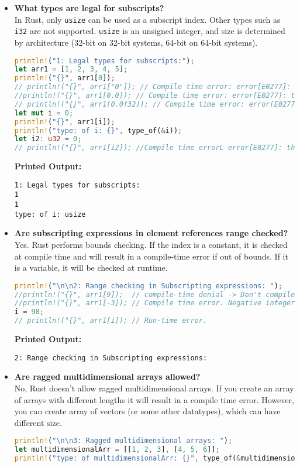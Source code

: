 \documentclass{article}
\begin{document}
\begin{itemize}
\item \textbf{What types are legal for subscripts?} \\
    In Rust, only \texttt{usize} can be used as a subscript index. Other types such as \texttt{i32} are not supported. \texttt{usize} is an unsigned integer, and size is determined by architecture (32-bit on 32-bit systems, 64-bit on 64-bit systems).  
\begin{lstlisting}[language=Rust]
println!("1: Legal types for subscripts:");
let arr1 = [1, 2, 3, 4, 5];
println!("{}", arr1[0]);
// println!("{}", arr1["0"]); // Compile time error: error[E0277]: the type `[{integer}]` cannot be indexed by `&str`
//println!("{}", arr1[0.0]); // Compile time error: error[E0277]: the type `[{integer}]` cannot be indexed by `float`
// println!("{}", arr1[0.0f32]); // Compile time error: error[E0277]: the type `[{integer}]` cannot be indexed by `f32`
let mut i = 0;
println!("{}", arr1[i]);
println!("type: of i: {}", type_of(&i));
let i2: u32 = 0;
// println!("{}", arr1[i2]); //Compile time errorL error[E0277]: the type `[{integer}]` cannot be indexed by `u32`
\end{lstlisting}
\textbf{Printed Output:}
\begin{verbatim}
1: Legal types for subscripts:
1
1
type: of i: usize
\end{verbatim}



\item \textbf{Are subscripting expressions in element references range checked?} \\
Yes. Rust performs bounds checking. If the index is a constant, it is checked at compile time and will result in a compile-time error if out of bounds. If it is a variable, it will be checked at runtime.
\begin{lstlisting}[language=Rust]
println!("\n\n2: Range checking in Subscripting expressions: ");
//println!("{}", arr1[9]);  // compile-time denial -> Don't compile.
//println!("{}", arr1[-3]); // Compile time error. Negative integers cannot be used to index on a [{integer},5]
i = 98;
// println!("{}", arr1[i]); // Run-time error.
\end{lstlisting}
\textbf{Printed Output:}
\begin{verbatim}
2: Range checking in Subscripting expressions: 
\end{verbatim}


\item \textbf{Are ragged multidimensional arrays allowed?} \\
No, Rust doesn't allow ragged multidimensional arrays. If you create an array of arrays with different lengths it will result in a compile time error. However, you can create array of vectors (or some other datatypes), which can have different size.  
\begin{lstlisting}[language=Rust]
println!("\n\n3: Ragged multidimensional arrays: ");
let multidimensionalArr = [[1, 2, 3], [4, 5, 6]];
println!("type: of multidimensionalArr: {}", type_of(&multidimensionalArr));


\end{lstlisting}
\end{itemize}
\end{document}
